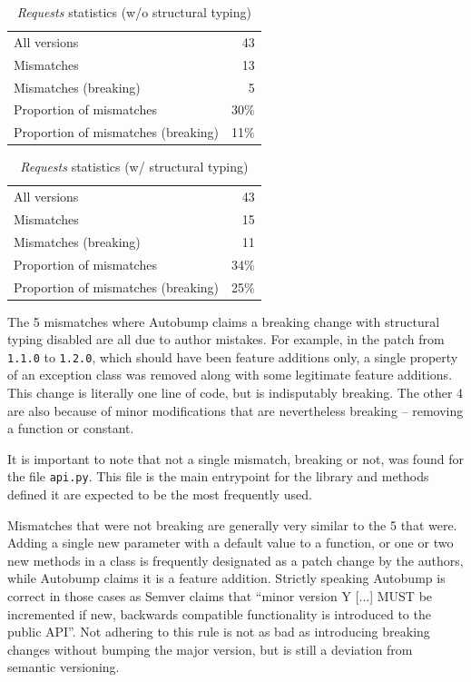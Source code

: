 \documentclass{l4proj}
\newcommand\genericstyle{\lstset{basicstyle=\ttm}}
\newcommand\codeinline[1]{{\genericstyle\lstinline!#1!}}
\begin{document}
\noindent
\begin{minipage}[t]{0.5\textwidth}
\begin{table}[H]
\centering
\begin{tabular}{|lr|}
All versions & 43 \\
Mismatches & 13 \\
Mismatches (breaking) & 5 \\
Proportion of mismatches & 30\% \\
Proportion of mismatches (breaking) & 11\%
\end{tabular}
\caption{\textit{Requests} statistics (w/o structural typing)}
\label{RequestsNonStructural}
\end{table}
\end{minipage}
\begin{minipage}[t]{0.5\textwidth}
\begin{table}[H]
\centering
\begin{tabular}{|lr|}
All versions & 43 \\
Mismatches & 15 \\
Mismatches (breaking) & 11 \\
Proportion of mismatches & 34\% \\
Proportion of mismatches (breaking) & 25\%
\end{tabular}
\caption{\textit{Requests} statistics (w/ structural typing)}
\label{RequestsStructural}
\end{table}
\end{minipage}

The 5 mismatches where Autobump claims a breaking change with
structural typing disabled are all due to author mistakes. For
example, in the patch from \codeinline{1.1.0} to \codeinline{1.2.0},
which should have been feature additions only, a single property of an
exception class was removed along with some legitimate feature
additions. This change is literally one line of code, but is
indisputably breaking. The other 4 are also because of minor
modifications that are nevertheless breaking -- removing a function or constant.

It is important to note that not a single mismatch, breaking or not,
was found for the file \codeinline{api.py}. This file is the main
entrypoint for the library and methods defined it are expected to be
the most frequently used.

Mismatches that were not breaking are generally very similar to the 5
that were. Adding a single new parameter with a default value to a
function, or one or two new methods in a class is frequently
designated as a patch change by the authors, while Autobump claims it
is a feature addition. Strictly speaking Autobump is correct in those
cases as Semver claims that ``minor version Y [...] MUST be
incremented if new, backwards compatible functionality is introduced
to the public API''. Not adhering to this rule is not as bad as
introducing breaking changes without bumping the major version, but is
still a deviation from semantic versioning.
\end{document}
